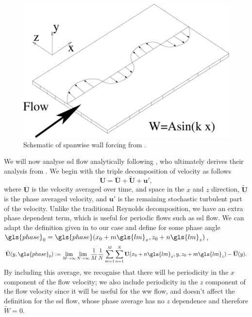 \begin{figure}[htbp]
\centering
\includegraphics[width=0.5\linewidth]{introduction/fig/ssl.png}
\caption{Schematic of spanwise wall forcing from \cite{viotti2009}.}
\label{fig:ssl}
\end{figure}

We will now analyse \gls{ssl} flow analytically following \textcite{chernyshenko2013}, who ultimately derives their analysis from \textcite{viotti2009}. We begin with the triple decomposition of velocity as follows
\begin{equation}
	\mathbf{U} = \overline{\mathbf{U} }+\tilde{\mathbf{U} }+\mathbf{u'}  
,\end{equation}
where $\overline{\mathbf{U} }$ is the velocity averaged over time, and space in the $x$ and  $z$ direction, $\tilde{\mathbf{U} }$ is the phase averaged velocity, and $\mathbf{u'} $ is the remaining stochastic turbulent part of the velocity. Unlike the traditional Reynolds decomposition, we have an extra phase dependent term, which is useful for periodic flows such as \gls{ssl} flow. We can adapt the definition given in \cite{baj2015} to our case and define for some phase angle $\gls{phase}_0=\gls{phase}(x_0+m \gls{lm}_x,z_0+n \gls{lm}_z)$,
\begin{equation}
	\tilde{\mathbf{U} }(y,\gls{phase}_0):=\lim_{M\to\infty}\lim_{N\to\infty}\frac{1}{M}\frac{1}{N} \sum_{m=1}^{M} \sum_{n=1}^{N} \mathbf{U}(x_0+n \gls{lm}_x,y,z_0 +m \gls{lm}_z)-\overline{\mathbf{U} }(y)  
.\end{equation}
By including this average, we recognise that there will be periodicity in the $x$ component of the flow velocity; we also include periodicity in the $z$ component of the flow velocity since it will be useful for the \gls{ww} flow, and doesn't affect the definition for the \gls{ssl} flow, whose phase average has no $z$ dependence and therefore $\tilde{W}=0$.

